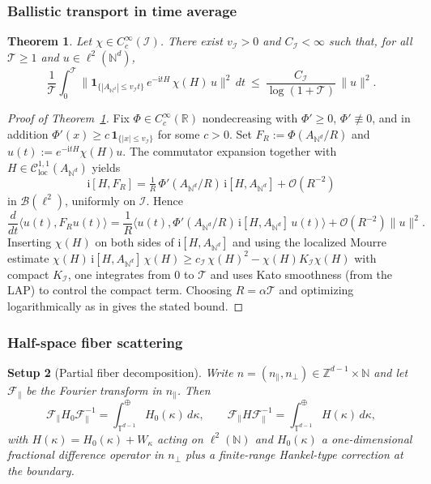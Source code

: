 \documentclass[10pt]{amsart}
\newcommand{\T}{{\mathbb{T}}}
\newcommand{\R}{{\mathbb{R}}}
\newcommand{\Z}{{\mathbb{Z}}}
\newcommand{\N}{{\mathbb{N}}}
\newcommand{\1}{{\mathbb{I}}}
\newcommand{\Bc}{\mathcal{B}}
\newcommand{\Cc}{\mathcal{C}}
\newcommand{\Fc}{\mathcal{F}}
\newcommand{\Ic}{\mathcal{I}}
\newcommand{\Oc}{\mathscr{O}}
\newcommand{\Tc}{\mathcal{T}}
\numberwithin{equation}{section}
\newtheorem{theorem}{Theorem}[section]%
\newtheorem{setup}[theorem]{Setup}
\begin{document}
\subsubsection{Ballistic transport in time average}\label{subsubsec:ballistic}
\begin{theorem}\label{thm:ballistic-lb}
Let $\chi\in C_c^\infty(\Ic)$. There exist $v_\Ic>0$ and $C_\Ic<\infty$ such that, for all $\Tc\ge1$ and $u\in\ell^2(\N^d)$,
\[
\frac{1}{\Tc}\int_0^\Tc \big\| \mathbf 1_{\{|A_{\N^d}|\le v_\Ic t\}}\,e^{-\mathrm i tH}\,\chi(H)\,u\big\|^2\,dt
\ \le\ \frac{C_\Ic}{\log(1+\Tc)}\,\|u\|^2.
\]
\end{theorem}

\begin{proof}[Proof of Theorem~\ref{thm:ballistic-lb}]
Fix $\Phi\in C_c^\infty(\R)$ nondecreasing with $\Phi'\ge 0$, $\Phi'\not\equiv0$, and in addition $\Phi'(x)\ge c\,\mathbf 1_{\{|x|\le v_\Ic\}}$ for some $c>0$.
Set $F_R:=\Phi(A_{\N^d}/R)$ and $u(t):=e^{-\mathrm i tH}\chi(H)u$.
The commutator expansion \cite[Prop.~6.2.10]{ABG} together with $H\in\Cc^{1,1}_{\mathrm{loc}}(A_{\N^d})$ yields
\[
\mathrm i[H,F_R]=\tfrac{1}{R}\,\Phi'(A_{\N^d}/R)\,\mathrm i[H,A_{\N^d}] + \Oc(R^{-2})
\]
in $\Bc(\ell^2)$, uniformly on $\Ic$. Hence
\[
\frac{d}{dt}\langle u(t),F_R u(t)\rangle
=\frac1R\langle u(t),\Phi'(A_{\N^d}/R)\,\mathrm i[H,A_{\N^d}]\,u(t)\rangle+\Oc(R^{-2})\|u\|^2.
\]
Inserting $\chi(H)$ on both sides of $\mathrm i[H,A_{\N^d}]$ and using the localized Mourre estimate
$\chi(H)\,\mathrm i[H,A_{\N^d}]\,\chi(H)\ge c_\Ic\,\chi(H)^2-\chi(H)K_\Ic\chi(H)$ with compact $K_\Ic$,
one integrates from $0$ to $\Tc$ and uses Kato smoothness (from the LAP) to control the compact term.
Choosing $R=\alpha\Tc$ and optimizing logarithmically as in \cite[\S~ 7.4]{ABG} gives the stated bound.
\end{proof}

\subsubsection{Half-space fiber scattering}\label{subsubsec:fiber-Nd}
\begin{setup}[Partial fiber decomposition]
Write $n=(n_\parallel,n_\perp)\in\Z^{d-1}\times\N$ and let $\Fc_\parallel$ be the Fourier transform in $n_\parallel$.
Then
\[
\Fc_\parallel H_{0} \Fc_\parallel^{-1}=\int_{\T^{d-1}}^\oplus H_{0}(\kappa)\,d\kappa,\qquad
\Fc_\parallel H \Fc_\parallel^{-1}=\int_{\T^{d-1}}^\oplus H(\kappa)\,d\kappa,
\]
with $H(\kappa)=H_{0}(\kappa)+W_\kappa$ acting on $\ell^2(\N)$ and $H_{0}(\kappa)$ a one-dimensional fractional difference
operator in $n_\perp$ plus a finite-range Hankel-type correction at the boundary.
\end{setup}
\end{document}
